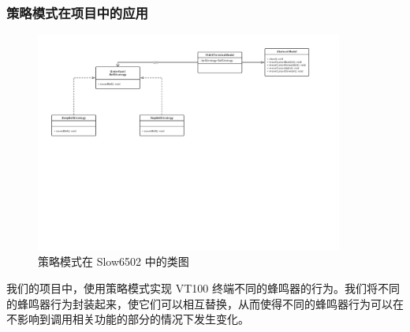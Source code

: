 \subsubsection{策略模式在项目中的应用}

\begin{figure}[h]
    \centering
    \includegraphics[width=0.9\textwidth]{figures/策略模式.pdf}
    \caption{策略模式在 Slow6502 中的类图}
\end{figure}

我们的项目中，使用策略模式实现 VT100 终端不同的蜂鸣器的行为。我们将不同的蜂鸣器行为封装起来，使它们可以相互替换，从而使得不同的蜂鸣器行为可以在不影响到调用相关功能的部分的情况下发生变化。
